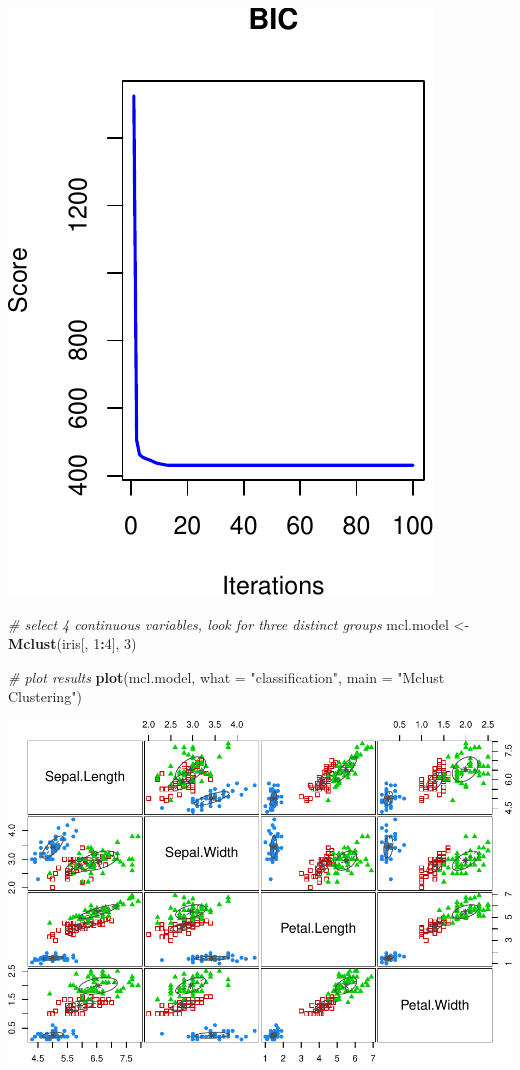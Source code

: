 \documentclass[12pt]{article}
\newenvironment{Shaded}{\begin{snugshade}}{\end{snugshade}}
\newcommand{\AttributeTok}[1]{\textcolor[rgb]{0.13,0.29,0.53}{#1}}
\newcommand{\CommentTok}[1]{\textcolor[rgb]{0.56,0.35,0.01}{\textit{#1}}}
\newcommand{\DecValTok}[1]{\textcolor[rgb]{0.00,0.00,0.81}{#1}}
\newcommand{\FunctionTok}[1]{\textcolor[rgb]{0.13,0.29,0.53}{\textbf{#1}}}
\newcommand{\NormalTok}[1]{#1}
\newcommand{\OtherTok}[1]{\textcolor[rgb]{0.56,0.35,0.01}{#1}}
\newcommand{\SpecialCharTok}[1]{\textcolor[rgb]{0.81,0.36,0.00}{\textbf{#1}}}
\newcommand{\StringTok}[1]{\textcolor[rgb]{0.31,0.60,0.02}{#1}}
\begin{document}
\includegraphics{CassieJinPaper_files/figure-latex/unnamed-chunk-7-1.pdf}

\begin{Shaded}
\begin{Highlighting}[]
\CommentTok{\# select 4 continuous variables, look for three distinct groups}
\NormalTok{mcl.model }\OtherTok{\textless{}{-}} \FunctionTok{Mclust}\NormalTok{(iris[, }\DecValTok{1}\SpecialCharTok{:}\DecValTok{4}\NormalTok{], }\DecValTok{3}\NormalTok{)}

\CommentTok{\# plot results}
\FunctionTok{plot}\NormalTok{(mcl.model, }\AttributeTok{what =} \StringTok{"classification"}\NormalTok{, }\AttributeTok{main =} \StringTok{"Mclust Clustering"}\NormalTok{)}
\end{Highlighting}
\end{Shaded}

\includegraphics{CassieJinPaper_files/figure-latex/unnamed-chunk-8-1.pdf}
\end{document}
